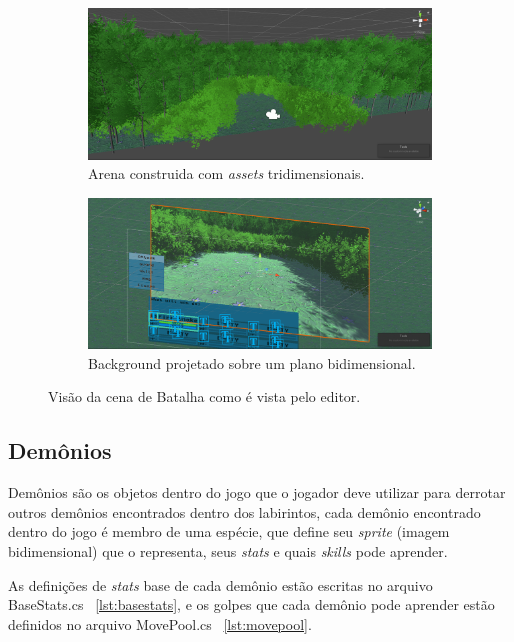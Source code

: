 \documentclass[
	12pt,				%
	openright,			%
	twoside,			%
	a4paper,			%
	english,			%
	french,				%
	spanish,			%
	brazil				%
	]{abntex2}
\begin{document}
\begin{figure}[h!]
  \centering
  \begin{subfigure}[b]{0.75\linewidth}
    \includegraphics[width=\linewidth]{arena.png}
     \caption{Arena construida com \emph{assets} tridimensionais.}
  \end{subfigure}
  \begin{subfigure}[b]{0.75\linewidth}
    \includegraphics[width=\linewidth]{background.png}
    \caption{Background projetado sobre um plano bidimensional.}
  \end{subfigure}
  \caption{Visão da cena de Batalha como é vista pelo editor.}
  \label{fig:background}
\end{figure}


\subsection{Demônios}

	Demônios são os objetos dentro do jogo que o jogador deve utilizar para derrotar outros demônios encontrados dentro dos labirintos, cada demônio encontrado dentro do jogo é membro de uma espécie, que define seu \emph{sprite} (imagem bidimensional) que o representa, seus \emph{stats} e quais \emph{skills} pode aprender.
	
	As definições de \emph{stats} base de cada demônio estão escritas no arquivo BaseStats.cs ~\ref{lst:basestats}, e os golpes que cada demônio pode aprender estão definidos no arquivo MovePool.cs ~\ref{lst:movepool}.
	
\end{document}
